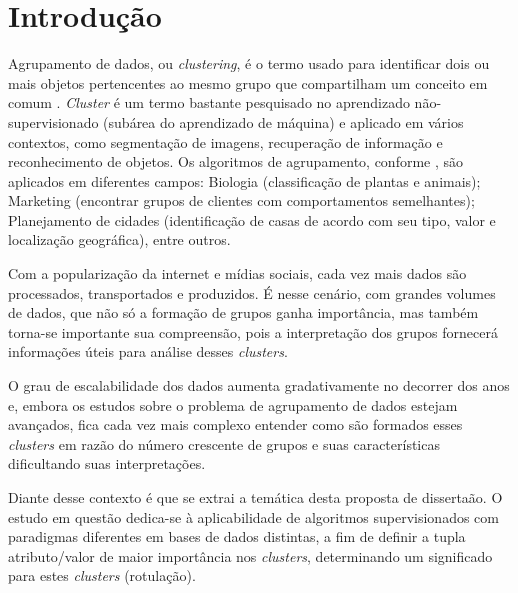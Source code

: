 

\chapter{Introdução} \label{cap:introd}

Agrupamento de dados, ou \textit{clustering}, é o termo usado para identificar dois ou  mais objetos pertencentes ao mesmo grupo que compartilham um conceito em comum    \cite{Kumar2013}. \textit{Cluster} é um termo bastante pesquisado no aprendizado não-supervisionado (subárea do aprendizado de máquina) e aplicado em vários contextos, como segmentação de imagens, recuperação de informação e reconhecimento de objetos. Os algoritmos de agrupamento, conforme , são aplicados em diferentes campos: Biologia (classificação de plantas e animais); Marketing (encontrar grupos de clientes com comportamentos semelhantes); Planejamento de cidades (identificação de casas de acordo com seu tipo, valor e localização geográfica), entre outros. 


Com a popularização da internet e mídias sociais, cada vez mais dados são processados, transportados e produzidos. É nesse cenário, com grandes volumes de dados, que não só a formação de grupos ganha importância, mas também torna-se importante sua compreensão, pois a interpretação dos grupos fornecerá informações úteis para análise desses \textit{clusters}. 

O grau de escalabilidade dos dados aumenta gradativamente no decorrer dos anos e, embora os estudos sobre o problema de agrupamento de dados estejam avançados, fica cada vez mais complexo entender como são formados esses \textit{clusters} em razão do número crescente de grupos e suas características dificultando suas interpretações. 

Diante desse contexto é que se extrai a temática desta proposta de dissertaão. O estudo em questão dedica-se à aplicabilidade de algoritmos supervisionados com paradigmas diferentes em bases de dados distintas, a fim de definir a tupla atributo/valor de maior importância nos \textit{clusters}, determinando um significado para estes \textit{clusters} (rotulação). 

